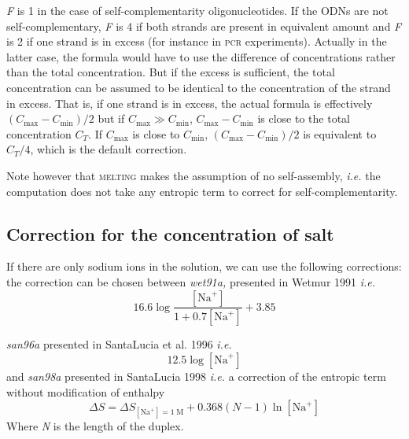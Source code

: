\documentclass{article}
\begin{document}
\textit{F} is 1 in the case of self-complementarity oligonucleotides. If the
ODNs are not self-complementary, \textit{F} is 4 if both strands are present in
equivalent amount and \textit{F} is 2 if one strand is in excess (for instance
in \textsc{pcr} experiments).  Actually in the latter case, the formula would
have to use the difference of concentrations rather than the total
concentration. But if the excess is sufficient, the total concentration can be
assumed to be identical to the concentration of the strand in excess. That is,
if one strand is in excess, the actual formula is effectively $(C_{\mbox{max}} -
C_{\mbox{min}})/2$ but if $C_{\mbox{max}} \gg C_{\mbox{min}}$, $C_{\mbox{max}}
- C_{\mbox{min}}$ is close to the total concentration $C_T$.  If $C_{\mbox{max}}$ is close
to $C_{\mbox{min}}$, $(C_{\mbox{max}} - C_{\mbox{min}})/2$ is equivalent to $C_T/4$, which is the default
correction.

Note however that \textsc{melting} makes the assumption of no self-assembly,
\textit{i.e.}  the computation does not take any entropic term to correct for
self-complementarity.
  
\subsection{Correction for the concentration of salt }  

If there are only sodium ions in the solution, we can use the following
corrections:  the correction can be chosen between \textit{wet91a,} presented in
Wetmur 1991 \textit{i.e.}
\begin{displaymath}
  16.6  \log \frac{[\mbox{Na}^+]}{1 + 0.7 [\mbox{Na}^+]} + 3.85   
\end{displaymath}

  \textit{san96a} presented in SantaLucia et al. 1996 
\textit{i.e.}  
\begin{displaymath}
12.5  \log [\mbox{Na}^+]   
\end{displaymath}
  and  \textit{san98a} presented in SantaLucia 1998 \textit{i.e.} a correction 
of the entropic term without modification of enthalpy  
\begin{displaymath}
  \Delta{}S=\Delta{}S_{[\mbox{Na}^+]=1\;\mathrm{M}}+0.368 (N-1) \ln [\mbox{Na}^+]   
\end{displaymath}
  Where \emph{N} is the length of the duplex.   
   
\end{document}

